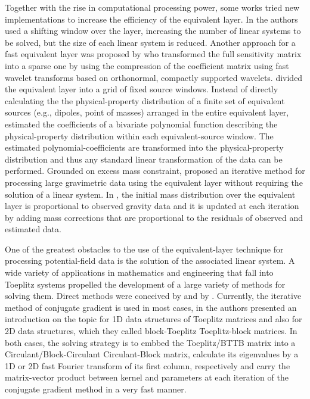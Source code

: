 \documentclass[manuscript]{geophysics}
\begin{document}
	Together with the rise in computational processing power, some works tried new implementations to increase the efficiency of the equivalent layer. 
	In \cite{leao-silva1989} the authors used a shifting window over the layer, increasing the number of linear systems to be solved, but the size of each linear system is reduced. 
	Another approach for a fast equivalent layer was proposed by \cite{li-oldenburg2010}  who transformed the full sensitivity matrix into a sparse one by using  the compression of the coefficient matrix 
	using fast wavelet transforms based on orthonormal, compactly supported wavelets.  
	\cite{oliveirajr-etal2013} divided the equivalent layer into a grid of fixed source windows.
	Instead of directly calculating the the physical-property distribution of a finite set of equivalent
	sources (e.g., dipoles, point of masses) arranged in the entire equivalent layer,
	\cite{oliveirajr-etal2013} estimated the coefficients of a bivariate polynomial function describing 
	the physical-property distribution within each equivalent-source window.
	The estimated polynomial-coefficients are transformed into the physical-property distribution
	and thus any standard linear transformation of the data can be performed.
	Grounded on excess mass constraint, \cite{siqueira-etal2017} proposed an iterative method 
	for processing large gravimetric data using the equivalent layer without requiring the solution 
	of a linear system. 
	In \cite{siqueira-etal2017}, the initial mass distribution over the equivalent layer is
	proportional to observed gravity data and it is updated at each iteration by adding mass corrections that are proportional to the residuals of observed and estimated data.
	
	One of the greatest obstacles to the use of the equivalent-layer technique for processing potential-field data is the solution of the associated linear system.
	A wide variety of applications in mathematics and engineering that fall into Toeplitz systems propelled the development of a large variety of  methods for solving them. Direct methods were conceived by \cite{levinson1946} and by \cite{trench1964}. Currently, the iterative method of conjugate gradient is used in most cases, in \cite{chan-jin2007} the authors presented an introduction on the topic for 1D data structures of Toeplitz matrices and also for 2D data structures, which they called block-Toeplitz Toeplitz-block matrices. In both cases, the solving strategy is to embbed the Toeplitz/BTTB matrix into a Circulant/Block-Circulant Circulant-Block matrix, calculate its eigenvalues by a 1D or 2D fast Fourier transform of its first column, respectively and carry the matrix-vector product between kernel and parameters at each iteration of the conjugate gradient method in a very fast manner.
	
\end{document}
